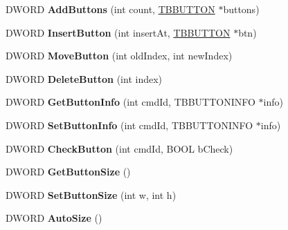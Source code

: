 \begin{DoxyCompactItemize}
\mbox{\label{class_c_toolbar_a42e4cbd654ed1480e7b00800e040bedc}} 
D\+W\+O\+RD {\bfseries Add\+Buttons} (int count, \hyperlink{struct___t_b_b_u_t_t_o_n}{T\+B\+B\+U\+T\+T\+ON} $\ast$buttons)
\item 
\mbox{\label{class_c_toolbar_a38b751e46c2750e01eb01712159936b7}} 
D\+W\+O\+RD {\bfseries Insert\+Button} (int insert\+At, \hyperlink{struct___t_b_b_u_t_t_o_n}{T\+B\+B\+U\+T\+T\+ON} $\ast$btn)
\item 
\mbox{\label{class_c_toolbar_a4f847520bace230ebb3520ae71484ed1}} 
D\+W\+O\+RD {\bfseries Move\+Button} (int old\+Index, int new\+Index)
\item 
\mbox{\label{class_c_toolbar_a22d8c2a5debdc2d72cfb958aecbb5584}} 
D\+W\+O\+RD {\bfseries Delete\+Button} (int index)
\item 
\mbox{\label{class_c_toolbar_ac90d8f1f7fa3b83483f86bf97f35c37a}} 
D\+W\+O\+RD {\bfseries Get\+Button\+Info} (int cmd\+Id, T\+B\+B\+U\+T\+T\+O\+N\+I\+N\+FO $\ast$info)
\item 
\mbox{\label{class_c_toolbar_a9fe4c9b76e3f7f317fbda94517849730}} 
D\+W\+O\+RD {\bfseries Set\+Button\+Info} (int cmd\+Id, T\+B\+B\+U\+T\+T\+O\+N\+I\+N\+FO $\ast$info)
\item 
\mbox{\label{class_c_toolbar_a7c2c7bf1ec0907faf670384a01aab445}} 
D\+W\+O\+RD {\bfseries Check\+Button} (int cmd\+Id, B\+O\+OL b\+Check)
\item 
\mbox{\label{class_c_toolbar_a54e733fc1ac048af66bedbfb10348188}} 
D\+W\+O\+RD {\bfseries Get\+Button\+Size} ()
\item 
\mbox{\label{class_c_toolbar_adbcd38ee57e8ba5cf2ef53add3d63da3}} 
D\+W\+O\+RD {\bfseries Set\+Button\+Size} (int w, int h)
\item 
\mbox{\label{class_c_toolbar_a0a9c08982820fae19795b808075ca5a6}} 
D\+W\+O\+RD {\bfseries Auto\+Size} ()
\item 
\mbox{\label{class_c_toolbar_a43e0cc746bc7614cbd6c06a6a87aeeee}} 

\end{DoxyCompactItemize}
